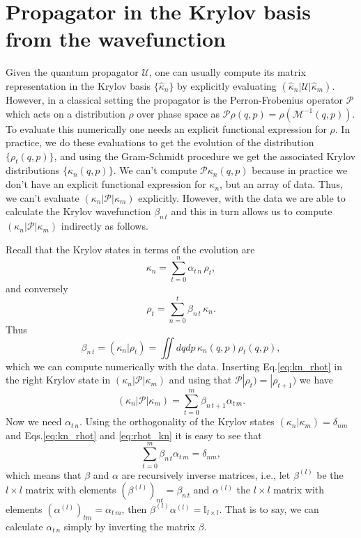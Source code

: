 \documentclass[12pt]{article}
\newcommand{\U}{\mathcal{U}} %
\newcommand{\PF}{\mathcal{P}} %
\newcommand{\kr}{\kappa} %
\newcommand{\M}{\mathcal{M}} %
\newcommand{\hkr}{\hat{\kappa}} %
\newcommand{\sket}[1]{|#1)}
\newcommand{\sbraket}[2]{\left(#1|#2\right)}
\newcommand{\smel}[3]{\left(#1|#2|#3\right)}
\newcommand{\bnt}[2]{\beta_{#1\,#2}}
\newcommand{\atn}[2]{\alpha_{#1\,#2}}
\begin{document}
\section{Propagator in the Krylov basis from the wavefunction}
Given the quantum propagator $\U$, one can usually compute its matrix representation in the Krylov basis $\{\hkr_n\}$ by explicitly evaluating $\smel{\hkr_n}{\U}{\hkr_m}$.
However, in a classical setting the propagator is the Perron-Frobenius operator $\PF$ which acts on a distribution $\rho$ over phase space as $\PF \rho(q, p) = \rho(\M^{-1}(q, p))$.
To evaluate this numerically one needs an explicit functional expression for $\rho$.
In practice, we do these evaluations to get the evolution of the distribution $\{\rho_t(q, p)\}$,
and using the Gram-Schmidt procedure we get the associated Krylov distributions $\{\kr_n(q, p)\}$.
We can't compute $\PF \kr_n(q, p)$ because in practice we don't have an explicit functional expression for $\kr_n$,
but an array of data.
Thus, we can't evaluate $\smel{\kr_n}{\PF}{\kr_m}$ explicitly.
However, with the data we are able to calculate the Krylov wavefunction $\bnt{n}{t}$ and this in turn allows us to compute $\smel{\kr_n}{\PF}{\kr_m}$ indirectly as follows.

Recall that the Krylov states in terms of the evolution are
\begin{equation}
    \kr_n = \sum_{t=0}^n \atn{t}{n}\,\rho_t,
    \label{eq:kn_rhot}
\end{equation}
and conversely
\begin{equation}
    \rho_t = \sum_{n=0}^t \bnt{n}{t}\,\kr_{n}
    \label{eq:rhot_kn}.
\end{equation}
Thus
$$
\bnt{n}{t} = \sbraket{\kr_n}{\rho_t} = \iint dqdp\, \kr_n(q, p) \rho_t(q, p),
$$
which we can compute numerically with the data.
Inserting Eq.\eqref{eq:kn_rhot} in the right Krylov state in $\smel{\kr_n}{\PF}{\kr_m}$
and using that $\PF \sket{\rho_t} = \sket{\rho_{t+1}}$ we have
$$
\boxed{
\smel{\kr_n}{\PF}{\kr_m} = \sum_{t=0}^m \bnt{n}{t+1} \atn{t}{m}
}.
$$
Now we need $\atn{t}{n}$.
Using the orthogonality of the Krylov states $\sbraket{\kr_n}{\kr_m} = \delta_{nm}$ and Eqs.\eqref{eq:kn_rhot} and \eqref{eq:rhot_kn} it is easy to see that
$$
\sum_{t=0}^m \bnt{n}{t} \atn{t}{m} = \delta_{nm},
$$
which means that $\beta$ and $\alpha$ are recursively inverse matrices,
i.e., let $\beta^{(l)}$ be the $l\times l$ matrix with elements $(\beta^{(l)})_{n t} = \bnt{n}{t}$ and $\alpha^{(l)}$ the $l\times l$ matrix with elements $(\alpha^{(l)})_{tm} = \atn{t}{m}$,
then $\beta^{(l)} \alpha^{(l)} = \mathbb{I}_{l\times l}$.
That is to say, we can calculate $\atn{t}{n}$ simply by inverting the matrix $\beta$.

\printbibliography
\end{document}
